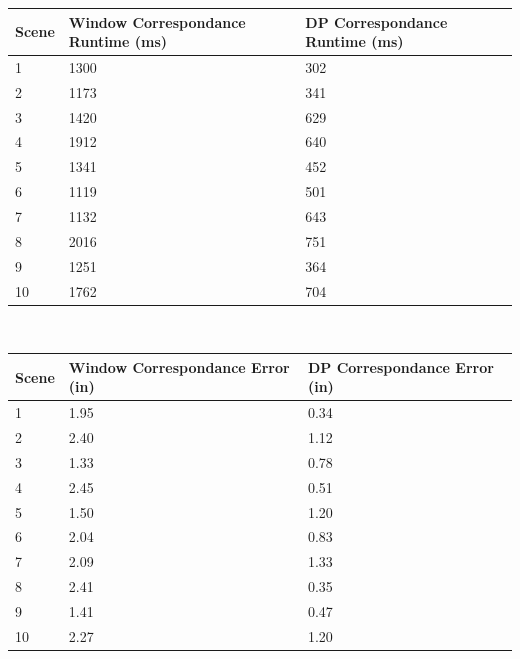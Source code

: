 \documentclass[11pt]{scrartcl}
\begin{document}
\begin{table}[H]
\begin{tabular}{lll}
\hline
Scene & Window Correspondance Runtime (ms) & DP Correspondance Runtime (ms) \\ \hline
1     & 1300                               & 302                            \\
2     & 1173                               & 341                            \\
3     & 1420                               & 629                            \\
4     & 1912                               & 640                            \\
5     & 1341                               & 452                            \\
6     & 1119                               & 501                            \\
7     & 1132                               & 643                            \\
8     & 2016                               & 751                            \\
9     & 1251                               & 364                            \\
10    & 1762                               & 704                            \\ \hline
\end{tabular}
\end{table}

\\
\begin{table}[H]
\begin{tabular}{lll}
\hline
Scene & Window Correspondance Error (in) & DP Correspondance Error (in) \\ \hline
1     & 1.95                             & 0.34                         \\
2     & 2.40                             & 1.12                         \\
3     & 1.33                             & 0.78                         \\
4     & 2.45                             & 0.51                         \\
5     & 1.50                             & 1.20                         \\
6     & 2.04                             & 0.83                         \\
7     & 2.09                             & 1.33                         \\
8     & 2.41                             & 0.35                         \\
9     & 1.41                             & 0.47                         \\
10    & 2.27                             & 1.20                         \\ \hline
\end{tabular}
\end{table}
\end{document}
